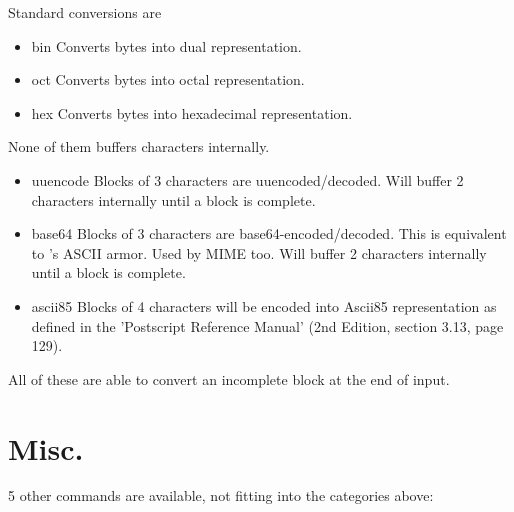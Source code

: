 \documentclass {report}
\begin{document}
Standard conversions are
\begin {itemize}
\item[bin]	Converts bytes into dual representation.
\item[oct]	Converts bytes into octal representation.
\item[hex]	Converts bytes into hexadecimal representation.
\end   {itemize}
None of them buffers characters internally.

\begin {itemize}
\item[uuencode]	Blocks of 3 characters are uuencoded/decoded. Will
		buffer 2 characters internally until a block is complete.
\item[base64]	Blocks of 3 characters are
		base64-encoded/decoded. This is equivalent to \PGP{}'s
		ASCII armor. Used by MIME too. Will buffer 2
		characters internally until a block is complete.
\item[ascii85]	Blocks of 4 characters will be encoded into Ascii85
		representation as defined in the 'Postscript Reference
		Manual' (2nd Edition, section 3.13, page 129).
\end   {itemize}
All of these are able to convert an incomplete block at the end of
input.

\section {Misc.}

5 other commands are available, not fitting into the categories above:
\end{document}
